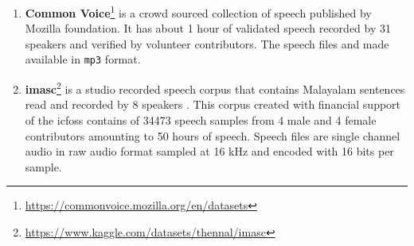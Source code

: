 \begin{enumerate}
	\item \textbf{Common Voice}\footnote{\url{https://commonvoice.mozilla.org/en/datasets}} is a crowd sourced collection of speech published by Mozilla foundation. It has about 1 hour of validated speech recorded by 31 speakers and verified by volunteer contributors. The speech files and made available in \texttt{mp3} format.

 \item \textbf{\Gls{imasc}}\footnote{\url{https://www.kaggle.com/datasets/thennal/imasc}}  is a studio recorded speech corpus that contains Malayalam sentences read and recorded by 8 speakers \cite{gopinath2022imasc}. This corpus created with financial support of the \Gls{icfoss} contains of 34473 speech samples from 4 male and 4 female contributors amounting to 50 hours of speech. Speech files are single channel audio in raw audio format sampled at 16 kHz and encoded with 16 bits per sample.

\end{enumerate}

